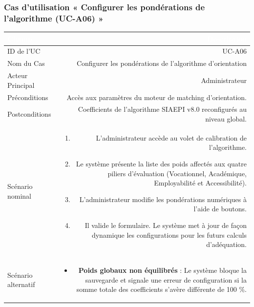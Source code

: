 \vspace{1.5em}

\subsubsection*{Cas d'utilisation « Configurer les pondérations de l'algorithme (UC-A06) »}

\noindent
\begin{tabular}{|L|R|}
\hline
{}\textcolor{white}{\textbf{Champ}} & \textcolor{white}{\textbf{Description}} \\
\hline
{}ID de l'UC & UC-A06 \\
\hline
Nom du Cas & Configurer les pondérations de l'algorithme d'orientation \\
\hline
{}Acteur Principal & Administrateur \\
\hline
Préconditions & Accès aux paramètres du moteur de matching d'orientation. \\
\hline
{}Postconditions & Coefficients de l'algorithme SIAEPI v8.0 reconfigurés au niveau global. \\
\hline
Scénario nominal &
\begin{enumerate}
  \item L'administrateur accède au volet de calibration de l'algorithme.
  \item Le système présente la liste des poids affectés aux quatre piliers d'évaluation (Vocationnel, Académique, Employabilité et Accessibilité).
  \item L'administrateur modifie les pondérations numériques à l'aide de boutons.
  \item Il valide le formulaire. Le système met à jour de façon dynamique les configurations pour les futurs calculs d'adéquation.
\end{enumerate} \\
\hline
{}Scénario alternatif &
\begin{itemize}
  \item \textbf{Poids globaux non équilibrés} : Le système bloque la sauvegarde et signale une erreur de configuration si la somme totale des coefficients s'avère différente de 100 \%.
\end{itemize} \\
\hline
\end{tabular}

\vspace{1.5em}

